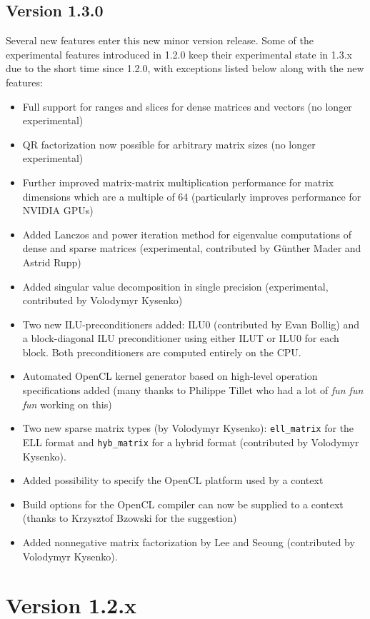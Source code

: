 \subsection*{Version 1.3.0}
Several new features enter this new minor version release.
Some of the experimental features introduced in 1.2.0 keep their experimental state in 1.3.x due to the short time since 1.2.0, with exceptions listed below along with the new features:
\begin{itemize}
 \item Full support for ranges and slices for dense matrices and vectors (no longer experimental)
 \item QR factorization now possible for arbitrary matrix sizes (no longer experimental)
 \item Further improved matrix-matrix multiplication performance for matrix dimensions which are a multiple of 64 (particularly improves performance for NVIDIA GPUs)
 \item Added Lanczos and power iteration method for eigenvalue computations of dense and sparse matrices (experimental, contributed by G\"unther Mader and Astrid Rupp)
 \item Added singular value decomposition in single precision (experimental, contributed by Volodymyr Kysenko)
 \item Two new ILU-preconditioners added: ILU0 (contributed by Evan Bollig) and a block-diagonal ILU preconditioner using either ILUT or ILU0 for each block. Both preconditioners are computed entirely on the CPU.
 \item Automated OpenCL kernel generator based on high-level operation specifications added (many thanks to Philippe Tillet who had a lot of \emph{fun fun fun} working on this)
 \item Two new sparse matrix types (by Volodymyr Kysenko): \lstinline|ell_matrix| for the ELL format and \lstinline|hyb_matrix| for a hybrid format (contributed by Volodymyr Kysenko).
 \item Added possibility to specify the OpenCL platform used by a context
 \item Build options for the OpenCL compiler can now be supplied to a context (thanks to Krzysztof Bzowski for the suggestion)
 \item Added nonnegative matrix factorization by Lee and Seoung (contributed by Volodymyr Kysenko).
\end{itemize}



\section*{Version 1.2.x}
 
